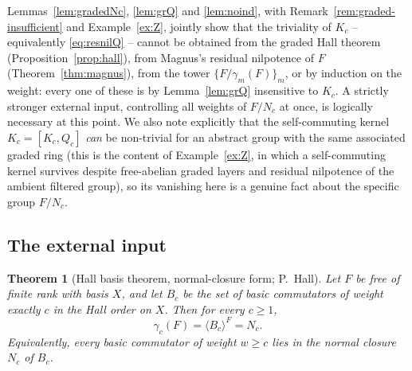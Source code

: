 \documentclass{amsart}
\newtheorem{theorem}{Theorem}
\theoremstyle{definition}
\theoremstyle{remark}
\begin{document}
\noindent
Lemmas~\ref{lem:gradedNc}, \ref{lem:grQ} and \ref{lem:noind}, with
Remark~\ref{rem:graded-insufficient} and Example~\ref{ex:Z}, jointly show that the
triviality of $K_c$ -- equivalently \eqref{eq:resnilQ} -- cannot be obtained from
the graded Hall theorem (Proposition~\ref{prop:hall}), from Magnus's residual
nilpotence of $F$ (Theorem~\ref{thm:magnus}), from the tower
$\{F/\gamma_m(F)\}_m$, or by induction on the weight: every one of these is by
Lemma~\ref{lem:grQ} insensitive to $K_c$. A strictly stronger external input,
controlling all weights of $F/N_c$ at once, is logically necessary at this point.
We also note explicitly that the self-commuting kernel $K_c=[K_c,Q_c]$ \emph{can}
be non-trivial for an abstract group with the same associated graded ring (this is
the content of Example~\ref{ex:Z}, in which a self-commuting kernel survives despite
free-abelian graded layers and residual nilpotence of the ambient filtered group),
so its vanishing here is a genuine fact about the specific group $F/N_c$.

\subsection{The external input}

\begin{theorem}[Hall basis theorem, normal-closure form; P.\ Hall]\label{thm:hall-full}
Let $F$ be free of finite rank with basis $X$, and let $B_c$ be the set of basic
commutators of weight exactly $c$ in the Hall order on $X$. Then for every $c\ge1$,
\[
\gamma_c(F)=\langle B_c\rangle^{F}=N_c .
\]
Equivalently, every basic commutator of weight $w\ge c$ lies in the normal closure
$N_c$ of $B_c$.
\end{theorem}
\end{document}
